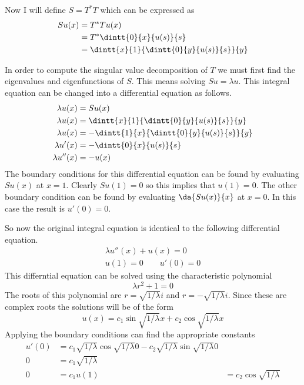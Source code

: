 \documentclass[11pt, oneside]{article}
\begin{document}
\begin{enumerate}
    Now I will define $S = T^* T$ which can be expressed as
    \begin{align*}
      Su(x) &= T^* T u(x) \\
      &= T^* \dintt{0}{x}{u(s)}{s} \\
      &= \dintt{x}{1}{\dintt{0}{y}{u(s)}{s}}{y}
    \end{align*}

    In order to compute the singular value decomposition of $T$ we must first
    find the eigenvalues and eigenfunctions of $S$.
    This means solving $Su = \lambda u$.
    This integral equation can be changed into a differential equation as
    follows.
    \begin{align*}
      \lambda u(x) &= Su(x) \\
      \lambda u(x) &= \dintt{x}{1}{\dintt{0}{y}{u(s)}{s}}{y} \\
      \lambda u(x) &= -\dintt{1}{x}{\dintt{0}{y}{u(s)}{s}}{y} \\
      \lambda u'(x) &= -\dintt{0}{x}{u(s)}{s} \\
      \lambda u''(x) &= -u(x) \\
    \end{align*}
    The boundary conditions for this differential equation can be found by
    evaluating $Su(x)$ at $x = 1$.
    Clearly $Su(1) = 0$ so this implies that $u(1) = 0$.
    The other boundary condition can be found by evaluating $\da{Su(x)}{x}$
    at $x = 0$.
    In this case the result is $u'(0) = 0$.

    So now the original integral equation is identical to the following
    differential equation.
    \begin{align*}
      \lambda u''(x) + u(x) = 0 \\
      u(1) = 0 \qquad u'(0) = 0
    \end{align*}
    This differntial equation can be solved using the characteristic polynomial
    \[
      \lambda r^2 + 1 = 0
    \]
    The roots of this polynomial are $r = \sqrt{1/\lambda} i$ and
    $r = -\sqrt{1/\lambda} i$.
    Since these are complex roots the solutions will be of the form
    \[
      u(x) = c_1 \sin{\sqrt{1/\lambda} x} + c_2 \cos{\sqrt{1/\lambda} x}
    \]
    Applying the boundary conditions can find the appropriate constants
    \begin{align*}
      u'(0) &= c_1 \sqrt{1/\lambda} \cos{\sqrt{1/\lambda} 0} - c_2 \sqrt{1/\lambda} \sin{\sqrt{1/\lambda} 0} \\
      0 &= c_1 \sqrt{1/\lambda} \\
      0 &= c_1
      u(1) &= c_2 \cos{\sqrt{1/\lambda}}
    \end{align*}
\end{enumerate}
\end{document}
